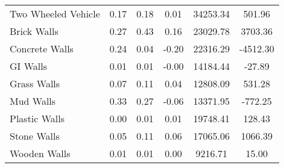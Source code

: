 \begin{tabular}{lccccc}
 Two Wheeled Vehicle &       0.17 &       0.18 &       0.01 &   34253.34 &     501.96 \\
         Brick Walls &       0.27 &       0.43 &       0.16 &   23029.78 &    3703.36 \\
      Concrete Walls &       0.24 &       0.04 &      -0.20 &   22316.29 &   -4512.30 \\
            GI Walls &       0.01 &       0.01 &      -0.00 &   14184.44 &     -27.89 \\
         Grass Walls &       0.07 &       0.11 &       0.04 &   12808.09 &     531.28 \\
           Mud Walls &       0.33 &       0.27 &      -0.06 &   13371.95 &    -772.25 \\
       Plastic Walls &       0.00 &       0.01 &       0.01 &   19748.41 &     128.43 \\
         Stone Walls &       0.05 &       0.11 &       0.06 &   17065.06 &    1066.39 \\
        Wooden Walls &       0.01 &       0.01 &       0.00 &    9216.71 &      15.00 \\
\hline
\end{tabular}
